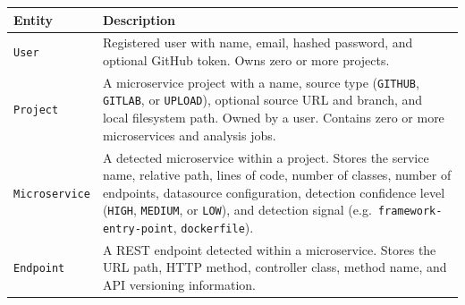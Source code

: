 \begin{table}[htbp]
    \centering
    \footnotesize
    \begin{tabular}{|l|p{9cm}|}
        \hline
        \textbf{Entity}              & \textbf{Description}                                                                                                                                                                                                                                                                                                                                                                                                          \\
        \hline\hline
        \texttt{User}                & Registered user with name, email, hashed password, and optional GitHub token. Owns zero or more projects.                                                                                                                                                                                                                                                                                                                     \\
        \hline
        \texttt{Project}             & A microservice project with a name, source type (\texttt{GITHUB}, \texttt{GITLAB}, or \texttt{UPLOAD}), optional source URL and branch, and local filesystem path. Owned by a user. Contains zero or more microservices and analysis jobs.                                                                                                                                                                                    \\
 \hline
        \texttt{Microservice}        & A detected microservice within a project. Stores the service name, relative path, lines of code, number of classes, number of endpoints, datasource configuration, detection confidence level (\texttt{HIGH}, \texttt{MEDIUM}, or \texttt{LOW}), and detection signal (e.g.\ \texttt{framework-entry-point}, \texttt{dockerfile}).                                                                                                                                                                                                                                                        \\
        \hline
        \texttt{Endpoint}            & A REST endpoint detected within a microservice. Stores the URL path, HTTP method, controller class, method name, and API versioning information.                                                                                                                                                                                                                                                                              \\

\end{tabular}
\end{table}
